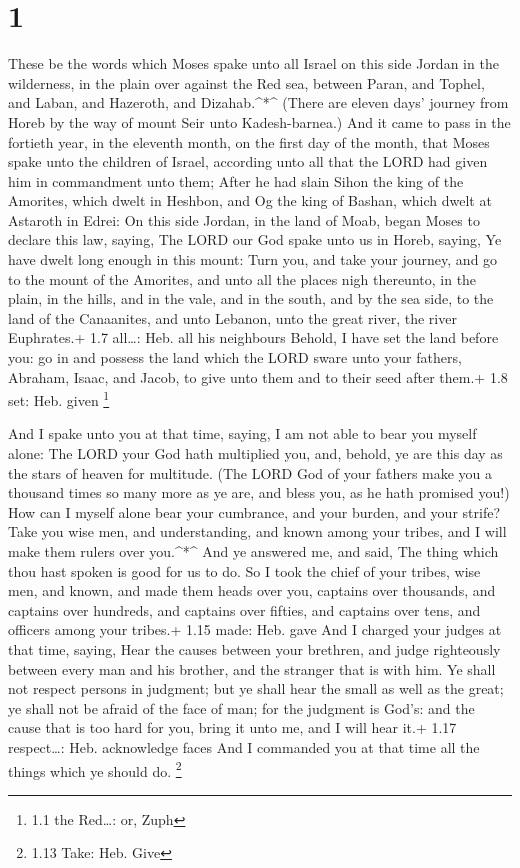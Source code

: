 \hypertarget{section}{%
\section{1}\label{section}}

 These be the words which Moses spake unto all Israel on
this side Jordan in the wilderness, in the plain over against the Red
sea, between Paran, and Tophel, and Laban, and Hazeroth, and
Dizahab.\^{}*\^{}  (There are eleven days' journey from
Horeb by the way of mount Seir unto Kadesh-barnea.)  And it
came to pass in the fortieth year, in the eleventh month, on the first
day of the month, that Moses spake unto the children of Israel,
according unto all that the LORD had given him in commandment unto them;
 After he had slain Sihon the king of the Amorites, which
dwelt in Heshbon, and Og the king of Bashan, which dwelt at Astaroth in
Edrei:  On this side Jordan, in the land of Moab, began
Moses to declare this law, saying,  The LORD our God spake
unto us in Horeb, saying, Ye have dwelt long enough in this mount:
 Turn you, and take your journey, and go to the mount of the
Amorites, and unto all the places nigh thereunto, in the plain, in the
hills, and in the vale, and in the south, and by the sea side, to the
land of the Canaanites, and unto Lebanon, unto the great river, the
river Euphrates.+ 1.7 all\ldots: Heb. all his neighbours 
Behold, I have set the land before you: go in and possess the land which
the LORD sware unto your fathers, Abraham, Isaac, and Jacob, to give
unto them and to their seed after them.+ 1.8 set: Heb. given \footnote{1.1
  the Red\ldots: or, Zuph}

 And I spake unto you at that time, saying, I am not able to
bear you myself alone:  The LORD your God hath multiplied
you, and, behold, ye are this day as the stars of heaven for multitude.
 (The LORD God of your fathers make you a thousand times so
many more as ye are, and bless you, as he hath promised you!)
 How can I myself alone bear your cumbrance, and your
burden, and your strife?  Take you wise men, and
understanding, and known among your tribes, and I will make them rulers
over you.\^{}*\^{}  And ye answered me, and said, The thing
which thou hast spoken is good for us to do.  So I took the
chief of your tribes, wise men, and known, and made them heads over you,
captains over thousands, and captains over hundreds, and captains over
fifties, and captains over tens, and officers among your tribes.+ 1.15
made: Heb. gave  And I charged your judges at that time,
saying, Hear the causes between your brethren, and judge righteously
between every man and his brother, and the stranger that is with him.
 Ye shall not respect persons in judgment; but ye shall
hear the small as well as the great; ye shall not be afraid of the face
of man; for the judgment is God's: and the cause that is too hard for
you, bring it unto me, and I will hear it.+ 1.17 respect\ldots: Heb.
acknowledge faces  And I commanded you at that time all the
things which ye should do. \footnote{1.13 Take: Heb. Give}

